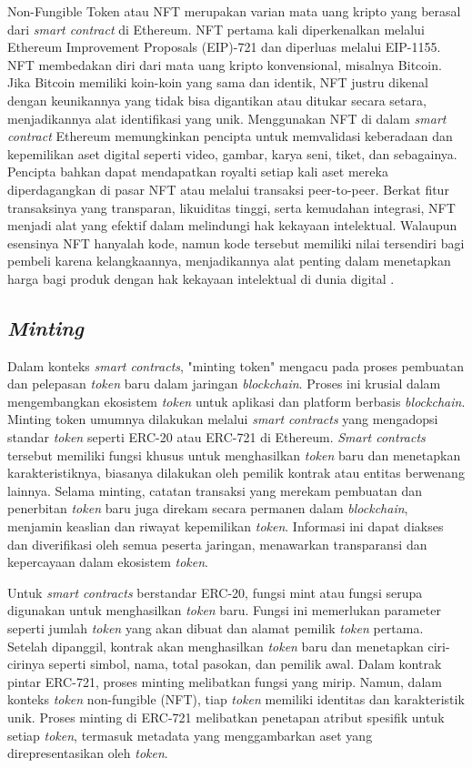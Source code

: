 Non-Fungible Token atau NFT merupakan varian mata uang kripto yang berasal dari \emph{smart contract} di Ethereum. NFT pertama kali diperkenalkan melalui Ethereum Improvement Proposals (EIP)-721 dan diperluas melalui EIP-1155. NFT membedakan diri dari mata uang kripto konvensional, misalnya Bitcoin. Jika Bitcoin memiliki koin-koin yang sama dan identik, NFT justru dikenal dengan keunikannya yang tidak bisa digantikan atau ditukar secara setara, menjadikannya alat identifikasi yang unik. Menggunakan NFT di dalam \emph{smart contract} Ethereum memungkinkan pencipta untuk memvalidasi keberadaan dan kepemilikan aset digital seperti video, gambar, karya seni, tiket, dan sebagainya. Pencipta bahkan dapat mendapatkan royalti setiap kali aset mereka diperdagangkan di pasar NFT atau melalui transaksi peer-to-peer. Berkat fitur transaksinya yang transparan, likuiditas tinggi, serta kemudahan integrasi, NFT menjadi alat yang efektif dalam melindungi hak kekayaan intelektual. Walaupun esensinya NFT hanyalah kode, namun kode tersebut memiliki nilai tersendiri bagi pembeli karena kelangkaannya, menjadikannya alat penting dalam menetapkan harga bagi produk dengan hak kekayaan intelektual di dunia digital \parencite{Wang2021}.

\subsection{\emph{Minting}}
Dalam konteks \emph{smart contracts}, "minting token" mengacu pada proses pembuatan dan pelepasan \emph{token} baru dalam jaringan \emph{blockchain}. Proses ini krusial dalam mengembangkan ekosistem \emph{token} untuk aplikasi dan platform berbasis \emph{blockchain}. Minting token umumnya dilakukan melalui \emph{smart contracts} yang mengadopsi standar \emph{token} seperti ERC-20 atau ERC-721 di Ethereum. \emph{Smart contracts} tersebut memiliki fungsi khusus untuk menghasilkan \emph{token} baru dan menetapkan karakteristiknya, biasanya dilakukan oleh pemilik kontrak atau entitas berwenang lainnya. Selama minting, catatan transaksi yang merekam pembuatan dan penerbitan \emph{token} baru juga direkam secara permanen dalam \emph{blockchain}, menjamin keaslian dan riwayat kepemilikan \emph{token}. Informasi ini dapat diakses dan diverifikasi oleh semua peserta jaringan, menawarkan transparansi dan kepercayaan dalam ekosistem \emph{token}. 

Untuk \emph{smart contracts} berstandar ERC-20, fungsi mint atau fungsi serupa digunakan untuk menghasilkan \emph{token} baru. Fungsi ini memerlukan parameter seperti jumlah \emph{token} yang akan dibuat dan alamat pemilik \emph{token} pertama. Setelah dipanggil, kontrak akan menghasilkan \emph{token} baru dan menetapkan ciri-cirinya seperti simbol, nama, total pasokan, dan pemilik awal. Dalam kontrak pintar ERC-721, proses minting melibatkan fungsi yang mirip. Namun, dalam konteks \emph{token} non-fungible (NFT), tiap \emph{token} memiliki identitas dan karakteristik unik. Proses minting di ERC-721 melibatkan penetapan atribut spesifik untuk setiap \emph{token}, termasuk metadata yang menggambarkan aset yang direpresentasikan oleh \emph{token}. 

